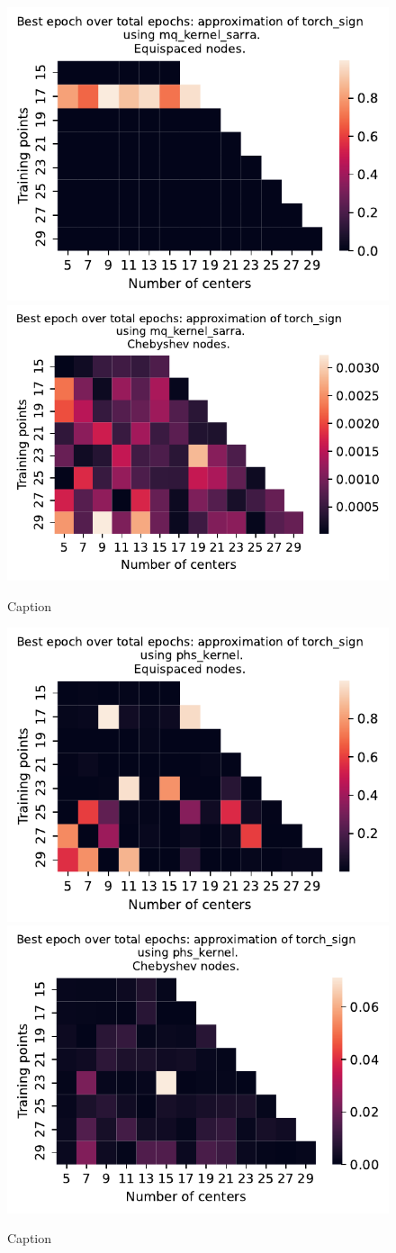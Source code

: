 \documentclass[12pt]{report} %
\begin{document}
\begin{figure}[ht]
  \centering

  \includegraphics[width=.49\textwidth]{imagenes/experiments/1d/variational_epochs/torch_sign-Kmq_kernel_sarra-Equi-epochs.pdf}
  \includegraphics[width=.49\textwidth]{imagenes/experiments/1d/variational_epochs/torch_sign-Kmq_kernel_sarra-Cheb-epochs.pdf}
  \caption{Caption}
  \label{fig:epochs-torch-sign-sarra}
\end{figure}


\begin{figure}[ht]
  \centering
  \includegraphics[width=.49\textwidth]{imagenes/experiments/1d/variational_epochs/torch_sign-Kphs_kernel-Equi-epochs.pdf}
  \includegraphics[width=.49\textwidth]{imagenes/experiments/1d/variational_epochs/torch_sign-Kphs_kernel-Cheb-epochs.pdf}
  \caption{Caption}
  \label{fig:epochs-torch-sign-phs}
\end{figure}
\end{document}
